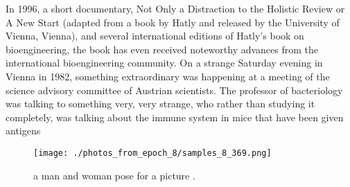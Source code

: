 \documentclass{article}%
\begin{document}
In 1996, a short documentary, Not Only a Distraction to the Holistic Review or A New Start (adapted from a book by Hatly and released by the University of Vienna, Vienna), and several international editions of Hatly's book on bioengineering, the book has even received noteworthy advances from the international bioengineering community.\newline%
On a strange Saturday evening in Vienna in 1982, something extraordinary was happening at a meeting of the science advisory committee of Austrian scientists. The professor of bacteriology was talking to something very, very strange, who rather than studying it completely, was talking about the immune system in mice that have been given antigens

%


\begin{figure}[h!]%
\centering%
\texttt{[image: ./photos\_from\_epoch\_8/samples\_8\_369.png]}%
\caption{a man and woman pose for a picture .}%
\end{figure}

%
\end{document}
